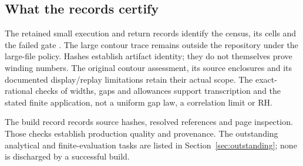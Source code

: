 \subsection{What the records certify}

The retained small execution and return records identify the census,
its cells and the failed gate \cite{OCCensus}. The large contour trace
remains outside the repository under the large-file policy. Hashes
establish artifact identity; they do not themselves prove winding
numbers. The original contour assessment, its source enclosures and
its documented display/replay limitations retain their actual scope.
The exact-rational checks of widths, gaps and allowances support
transcription and the stated finite application, not a uniform gap
law, a correlation limit or RH.

The build record records source hashes, resolved references and page
inspection. Those checks establish production quality and provenance.
The outstanding analytical and finite-evaluation tasks are listed in
Section~\ref{sec:outstanding}; none is discharged by a successful build.
